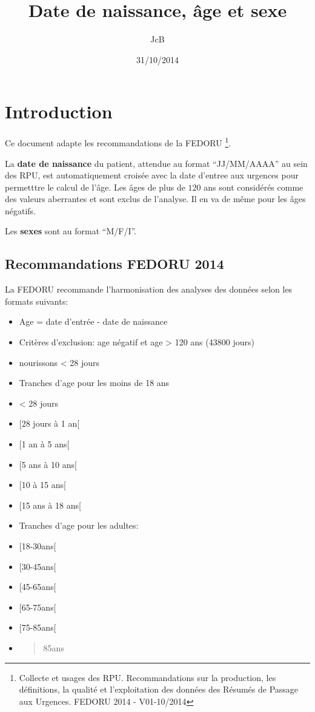 \documentclass[]{article}
\title{Date de naissance, âge et sexe}
\author{JcB}
\date{31/10/2014}
\begin{document}
\maketitle


{
\hypersetup{linkcolor=black}
\setcounter{tocdepth}{2}
\tableofcontents
}
\section{Introduction}\label{introduction}

Ce document adapte les recommandations de la FEDORU
\footnote{Collecte et usages des RPU. Recommandations sur la production, les définitions, la qualité et l'exploitation des données des Résumés de Passage aux Urgences. FEDORU 2014 - V01-10/2014}.

La \textbf{date de naissance} du patient, attendue au format
``JJ/MM/AAAA'' au sein des RPU, est automatiquement croisée avec la date
d'entree aux urgences pour permetttre le calcul de l'âge. Les âges de
plus de $120$ ans sont considérés comme des valeurs aberrantes et sont
exclus de l'analyse. Il en va de même pour les âges négatifs.

Les \textbf{sexes} sont au format ``M/F/I''.

\subsection{Recommandations FEDORU
2014}\label{recommandations-fedoru-2014}

La FEDORU recommande l'harmonisation des analyses des données selon les
formats suivants:

\begin{itemize}
\item
  Age = date d'entrée - date de naissance
\item
  Critères d'exclusion: age négatif et age \textgreater{} 120 ans (43800
  jours)
\item
  nourissons \textless{} 28 jours
\item
  Tranches d'age pour les moins de 18 ans
\item
  \textless{} 28 jours
\item
  {[}28 jours à 1 an{[}
\item
  {[}1 an à 5 ans{[}
\item
  {[}5 ans à 10 ans{[}
\item
  {[}10 à 15 ans{[}
\item
  {[}15 ans à 18 ans{[}
\item
  Tranches d'age pour les adultes:
\item
  {[}18-30ans{[}
\item
  {[}30-45ans{[}
\item
  {[}45-65ans{[}
\item
  {[}65-75ans{[}
\item
  {[}75-85ans{[}
\item
  \begin{quote}
  85ans
  \end{quote}
\end{itemize}
\end{document}
